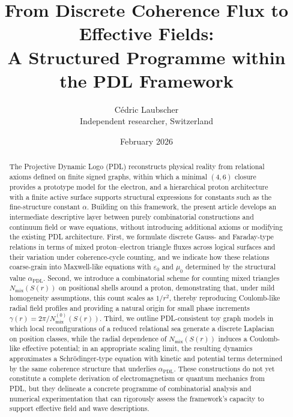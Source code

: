 \documentclass[11pt,a4paper]{article}
\title{%
From Discrete Coherence Flux to Effective Fields:\\
A Structured Programme within the PDL Framework
}
\author{C\'edric Laubscher\\
\small Independent researcher, Switzerland}
\date{February 2026}
\begin{document}
\maketitle

\begin{abstract}
The Projective Dynamic Logo (PDL) reconstructs physical reality from relational axioms defined on finite signed graphs, within which a minimal $(4,6)$ closure provides a prototype model for the electron, and a hierarchical proton architecture with a finite active surface supports structural expressions for constants such as the fine-structure constant $\alpha$.\cite{Laubscher2026FullPDL,Laubscher2026Alpha}
Building on this framework, the present article develops an intermediate descriptive layer between purely combinatorial constructions and continuum field or wave equations, without introducing additional axioms or modifying the existing PDL architecture.
First, we formulate discrete Gauss- and Faraday-type relations in terms of mixed proton–electron triangle fluxes across logical surfaces and their variation under coherence-cycle counting, and we indicate how these relations coarse-grain into Maxwell-like equations with $\varepsilon_{0}$ and $\mu_{0}$ determined by the structural value $\alpha_{\mathrm{PDL}}$.\cite{Laubscher2026SchrodingerSketch}
Second, we introduce a combinatorial scheme for counting mixed triangles $N_{\mathrm{mix}}(S(r))$ on positional shells around a proton, demonstrating that, under mild homogeneity assumptions, this count scales as $1/r^{2}$, thereby reproducing Coulomb-like radial field profiles and providing a natural origin for small phase increments $\gamma(r)=2\pi/N_{\mathrm{mix}}^{(0)}(S(r))$.\cite{Laubscher2026SchrodingerPDL}
Third, we outline PDL-consistent toy graph models in which local reconfigurations of a reduced relational sea generate a discrete Laplacian on position classes, while the radial dependence of $N_{\mathrm{mix}}(S(r))$ induces a Coulomb-like effective potential; in an appropriate scaling limit, the resulting dynamics approximates a Schr\"odinger-type equation with kinetic and potential terms determined by the same coherence structure that underlies $\alpha_{\mathrm{PDL}}$.\cite{Laubscher2026SchrodingerSketch}
These constructions do not yet constitute a complete derivation of electromagnetism or quantum mechanics from PDL, but they delineate a concrete programme of combinatorial analysis and numerical experimentation that can rigorously assess the framework’s capacity to support effective field and wave descriptions.
\end{abstract}
\end{document}
